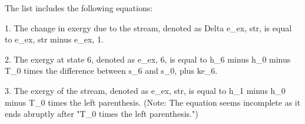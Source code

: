 The list includes the following equations:

1. The change in exergy due to the stream, denoted as Delta e_ex, str, is equal to e_ex, str minus e_ex, 1.

2. The exergy at state 6, denoted as e_ex, 6, is equal to h_6 minus h_0 minus T_0 times the difference between s_6 and s_0, plus ke_6.

3. The exergy of the stream, denoted as e_ex, str, is equal to h_1 minus h_0 minus T_0 times the left parenthesis. (Note: The equation seems incomplete as it ends abruptly after "T_0 times the left parenthesis.")